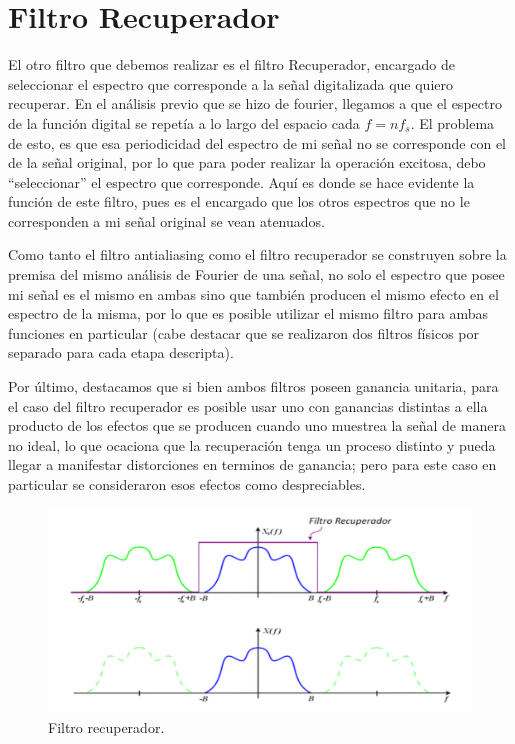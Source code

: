 \documentclass[../../ASSD_TP1_G7.tex]{subfiles}
\begin{document}
\section{Filtro Recuperador}

El otro filtro que debemos realizar es el filtro Recuperador, encargado
de seleccionar el espectro que corresponde a la señal digitalizada
que quiero recuperar. En el análisis previo que se hizo de fourier,
llegamos a que el espectro de la función digital se repetía a lo largo
del espacio cada $f=nf_{s}$. El problema de esto, es que esa periodicidad
del espectro de mi señal no se corresponde con el de la señal original,
por lo que para poder realizar la operación excitosa, debo ``seleccionar''
el espectro que corresponde. Aquí es donde se hace evidente la función
de este filtro, pues es el encargado que los otros espectros que no
le corresponden a mi señal original se vean atenuados. 

Como tanto el filtro antialiasing como el filtro recuperador se construyen
sobre la premisa del mismo análisis de Fourier de una señal, no solo
el espectro que posee mi señal es el mismo en ambas sino que también
producen el mismo efecto en el espectro de la misma, por lo que es
posible utilizar el mismo filtro para ambas funciones en particular
(cabe destacar que se realizaron dos filtros físicos por separado
para cada etapa descripta). 

Por último, destacamos que si bien ambos filtros poseen ganancia unitaria,
para el caso del filtro recuperador es posible usar uno con ganancias
distintas a ella producto de los efectos que se producen cuando uno
muestrea la señal de manera no ideal, lo que ocaciona que la recuperación
tenga un proceso distinto y pueda llegar a manifestar distorciones
en terminos de ganancia; pero para este caso en particular se consideraron
esos efectos como despreciables.

\begin{figure}[H]

\begin{centering}
\includegraphics[scale=0.6]{Imagenes/recuperador.PNG}\caption{Filtro recuperador.}
\par\end{centering}
\end{figure}
\end{document}
